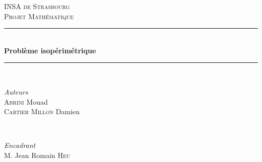 \documentclass[12pt]{report}
\begin{document}

\begin{titlepage} %
	\newcommand{\HRule}{\rule{\linewidth}{0.5mm}} %
	
	\center %
	
	
	\textsc{\LARGE INSA de Strasbourg}\\[1.2cm] %
	
	\textsc{\Large Projet Mathématique}\\[0.5cm] %
	
	
	
	\HRule\\[0.4cm]
	
	{\huge\bfseries Problème isopérimétrique}\\[0.4cm] %
	
	\HRule\\[1.5cm]
	
	
	\begin{minipage}{0.4\textwidth}
		\begin{flushleft}
			\large
			\textit{Auteurs}\\
			\textsc{Abrini} Mouad\\ %
			\textsc{Cartier Millon} Damien %
		\end{flushleft}
	\end{minipage}
	~
	\begin{minipage}{0.4\textwidth}
		\begin{flushright}
			\large
			\textit{Encadrant}\\
			M. Jean Romain \textsc{Heu} %
		\end{flushright}
	\end{minipage}
	

\end{titlepage}
\end{document}
